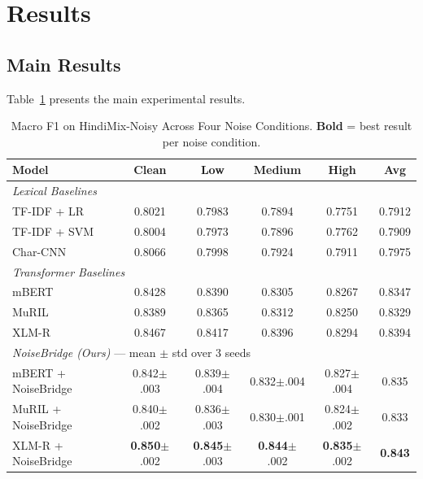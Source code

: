 \documentclass[conference]{IEEEtran}
\begin{document}
\section{Results}
\label{sec:results}

\subsection{Main Results}

Table~\ref{tab:main_results} presents the main experimental results.

\begin{table}[t]
\caption{Macro F1 on HindiMix-Noisy Across Four Noise Conditions. \textbf{Bold} = best result per noise condition.}
\label{tab:main_results}
\centering
\begin{tabular}{l@{\hskip 14pt}cccc@{\hskip 14pt}c}
\toprule
\textbf{Model} & \textbf{Clean} & \textbf{Low} & \textbf{Medium} & \textbf{High} & \textbf{Avg} \\
\midrule
\multicolumn{6}{l}{\textit{Lexical Baselines}} \\
TF-IDF + LR           & 0.8021 & 0.7983 & 0.7894 & 0.7751 & 0.7912 \\
TF-IDF + SVM           & 0.8004 & 0.7973 & 0.7896 & 0.7762 & 0.7909 \\
Char-CNN               & 0.8066 & 0.7998 & 0.7924 & 0.7911 & 0.7975 \\
\midrule
\multicolumn{6}{l}{\textit{Transformer Baselines}} \\
mBERT                  & 0.8428 & 0.8390 & 0.8305 & 0.8267 & 0.8347 \\
MuRIL                  & 0.8389 & 0.8365 & 0.8312 & 0.8250 & 0.8329 \\
XLM-R                  & 0.8467 & 0.8417 & 0.8396 & 0.8294 & 0.8394 \\
\midrule
\multicolumn{6}{l}{\textit{NoiseBridge (Ours)} --- mean $\pm$ std over 3 seeds} \\
mBERT + NoiseBridge   & 0.842{\scriptsize$\pm$.003} & 0.839{\scriptsize$\pm$.004} & 0.832{\scriptsize$\pm$.004} & 0.827{\scriptsize$\pm$.004} & 0.835 \\
MuRIL + NoiseBridge   & 0.840{\scriptsize$\pm$.002} & 0.836{\scriptsize$\pm$.003} & 0.830{\scriptsize$\pm$.001} & 0.824{\scriptsize$\pm$.002} & 0.833 \\
XLM-R + NoiseBridge   & \textbf{0.850}{\scriptsize$\pm$.002} & \textbf{0.845}{\scriptsize$\pm$.003} & \textbf{0.844}{\scriptsize$\pm$.002} & \textbf{0.835}{\scriptsize$\pm$.002} & \textbf{0.843} \\
\bottomrule
\end{tabular}
\end{table}
\end{document}
